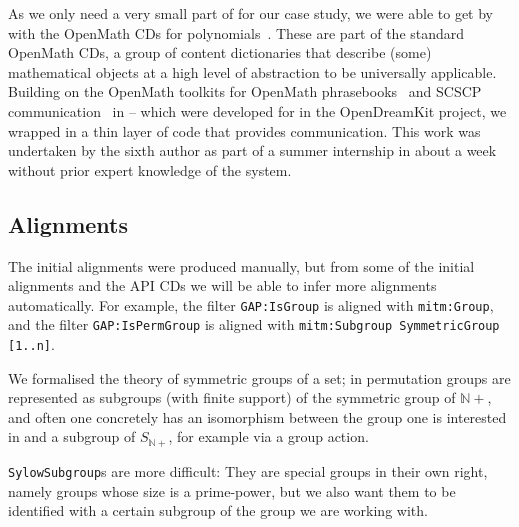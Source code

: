 As we only need a very small part of \Singular for our case study, we were able to get by
with the OpenMath CDs for polynomials~\cite{OMCD:poly:on}. These are part of the standard
OpenMath CDs, a group of content dictionaries that describe (some) mathematical objects at
a high level of abstraction to be universally applicable. Building on the OpenMath
toolkits for OpenMath phrasebooks~\cite{py-openmath:on} and SCSCP
communication~\cite{py-scscp:on} in \Python -- which were developed for \Sage in the
OpenDreamKit project, we wrapped \Singular in a thin layer of \Python code that provides
\SCSCP communication. This work was undertaken by the sixth author as part of a summer
internship in about a week without prior expert knowledge of the system.

\subsection{Alignments}

The initial alignments were produced manually, but from some of the initial alignments
and the \GAP API CDs we will be able to infer more alignments automatically.  For example,
the filter \texttt{GAP:IsGroup} is aligned with
\texttt{mitm:Group}, and the filter \texttt{GAP:IsPermGroup} is aligned with
\texttt{mitm:Subgroup SymmetricGroup [1..n]}.  

We formalised the theory of symmetric groups of a set; in \GAP permutation groups
are represented as subgroups (with finite support) of the symmetric group of
$\mathbb{N}+$, and often one concretely has an isomorphism between the group one
is interested in and a subgroup of $S_{\mathbb{N}+}$, for example
via a group action.

\texttt{SylowSubgroup}s are more difficult: They are special groups in their
own right, namely groups whose size is a prime-power, but we also want them
to be identified with a certain subgroup of the group we are working
with.

